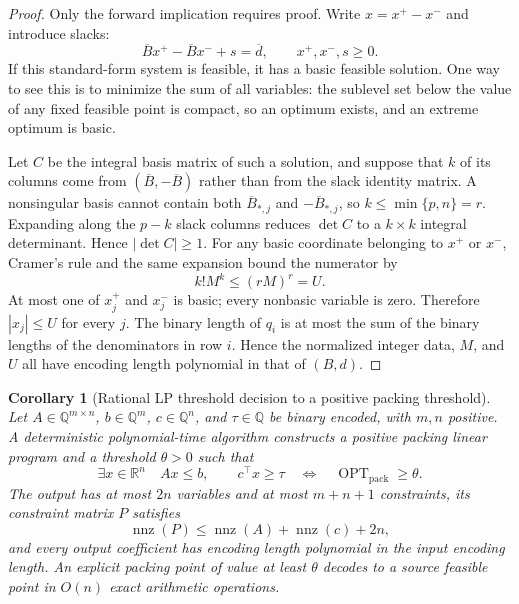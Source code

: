 \documentclass[11pt]{article}
\newtheorem{corollary}[theorem]{Corollary}
\theoremstyle{remark}
\newcommand{\R}{\mathbb{R}}
\newcommand{\nnz}{\operatorname{nnz}}
\newcommand{\OPT}{\operatorname{OPT}}
\begin{document}
\begin{proof}
Only the forward implication requires proof.  Write
$x=x^+-x^-$ and introduce slacks:
\[
  \overline Bx^+-\overline Bx^-+s=\overline d,
  \qquad x^+,x^-,s\geq0.
\]
If this standard-form system is feasible, it has a basic feasible
solution.  One way to see this is to minimize the sum of all variables:
the sublevel set below the value of any fixed feasible point is compact,
so an optimum exists, and an extreme optimum is basic.

Let $C$ be the integral basis matrix of such a solution, and suppose
that $k$ of its columns come from
$(\overline B,-\overline B)$ rather than from the slack identity
matrix.  A nonsingular basis cannot contain both
$\overline B_{*,j}$ and $-\overline B_{*,j}$, so
$k\leq\min\{p,n\}=r$.  Expanding along the $p-k$ slack columns reduces
$\det C$ to a $k\times k$ integral determinant.  Hence
$|\det C|\geq1$.  For any basic coordinate belonging to $x^+$ or
$x^-$, Cramer's rule and the same expansion bound the numerator by
\[
  k!M^k\leq(rM)^r=U.
\]
At most one of $x_j^+$ and $x_j^-$ is basic; every nonbasic variable is
zero.  Therefore $|x_j|\leq U$ for every $j$.  The binary length of
$q_i$ is at most the sum of the binary lengths of the denominators in
row $i$.  Hence the normalized integer data, $M$, and $U$ all have
encoding length polynomial in that of $(B,d)$.
\end{proof}

\begin{corollary}[Rational LP threshold decision to a positive packing threshold]
\label{cor:general-lp}
Let $A\in\mathbb{Q}^{m\times n}$, $b\in\mathbb{Q}^m$,
$c\in\mathbb{Q}^n$, and $\tau\in\mathbb{Q}$ be binary encoded, with
$m,n$ positive.  A deterministic polynomial-time algorithm constructs
a positive packing linear program and a threshold $\theta>0$ such that
\[
  \exists x\in\R^n
  \quad
  Ax\leq b,
  \qquad
  c^\top x\geq\tau
  \quad\Longleftrightarrow\quad
  \OPT_{\mathrm{pack}}\geq\theta.
\]
The output has at most $2n$ variables and at most $m+n+1$
constraints, its constraint matrix $P$ satisfies
\[
  \nnz(P)\leq\nnz(A)+\nnz(c)+2n,
\]
and every output coefficient has encoding length polynomial in the
input encoding length.  An explicit packing point of value at least
$\theta$ decodes to a source feasible point in $O(n)$ exact arithmetic
operations.
\end{corollary}
\end{document}
